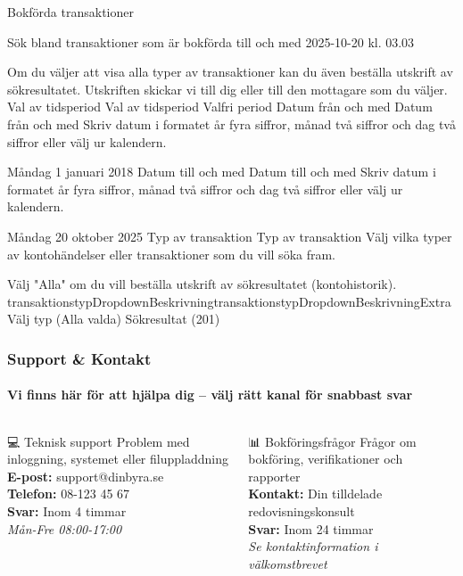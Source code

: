 \documentclass[10pt]{beamer}
\begin{document}

\begin{frame}[fragile]Bokförda transaktioner

Sök bland transaktioner som är bokförda till och med 2025-10-20 kl. 03.03

Om du väljer att visa alla typer av transaktioner kan du även beställa utskrift av sökresultatet. Utskriften skickar vi till dig eller till den mottagare som du väljer.
Val av tidsperiod Val av tidsperiod
Valfri period
Datum från och med Datum från och med
Skriv datum i formatet år fyra siffror, månad två siffror och dag två siffror eller välj ur kalendern.

Måndag 1 januari 2018
Datum till och med Datum till och med
Skriv datum i formatet år fyra siffror, månad två siffror och dag två siffror eller välj ur kalendern.

Måndag 20 oktober 2025
Typ av transaktion Typ av transaktion
Välj vilka typer av kontohändelser eller transaktioner som du vill söka fram.

Välj "Alla" om du vill beställa utskrift av sökresultatet (kontohistorik).
transaktionstypDropdownBeskrivningtransaktionstypDropdownBeskrivningExtra
Välj typ (Alla valda)
Sökresultat (201)

  \frametitle{Support \& Kontakt}
  \framesubtitle{Vi finns här för att hjälpa dig – välj rätt kanal för snabbast svar}

  \begin{columns}[T]
  
  \begin{block}{💻 Teknisk support}
    \footnotesize
    Problem med inloggning, systemet eller filuppladdning\\
    \textbf{E-post:} support@dinbyra.se\\
    \textbf{Telefon:} 08-123 45 67\\
    \textbf{Svar:} Inom 4 timmar\\
    \textit{Mån-Fre 08:00-17:00}
  \end{block}

  \vspace{0.3cm}

  \begin{block}{📊 Bokföringsfrågor}
    \footnotesize
    Frågor om bokföring, verifikationer och rapporter\\
    \textbf{Kontakt:} Din tilldelade redovisningskonsult\\
    \textbf{Svar:} Inom 24 timmar\\
    \textit{Se kontaktinformation i välkomstbrevet}
  \end{block}


\end{columns}
\end{frame}
\end{document}
